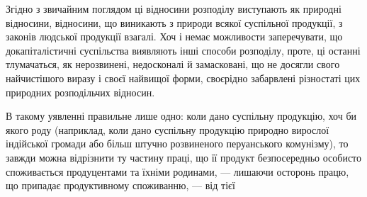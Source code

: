 Згідно з звичайним поглядом ці відносини розподілу виступають як природні
відносини, відносини, що виникають з природи всякої суспільної продукції, з
законів людської продукції взагалі. Хоч і немає можливости заперечувати, що
докапіталістичні суспільства виявляють інші способи розподілу, проте, ці останні
тлумачаться, як нерозвинені, недосконалі й замасковані, що не досягли свого
найчистішого виразу і своєї найвищої форми, своєрідно забарвлені різностаті
цих природних розподільчих відносин.

В такому уявленні правильне лише одно: коли дано суспільну продукцію,
хоч би якого роду (наприклад, коли дано суспільну продукцію природно вирослої
індійської громади або більш штучно розвиненого перуанського комунізму),
то завжди можна відрізнити ту частину праці, що її продукт безпосередньо
особисто споживається продуцентами та їхніми    родинами, — лишаючи
осторонь працю, що припадає продуктивному споживанню, — від тієї
\parbreak{}  %
